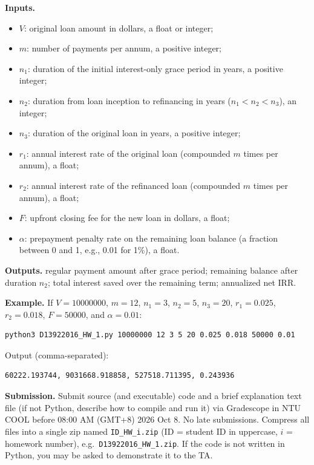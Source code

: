 \documentclass[11pt,a4paper]{article}
\begin{document}
\textbf{Inputs.}
\begin{itemize}[nosep]
  \item $V$: original loan amount in dollars, a float or integer;
  \item $m$: number of payments per annum, a positive integer;
  \item $n_1$: duration of the initial interest-only grace period in years, a positive integer;
  \item $n_2$: duration from loan inception to refinancing in years ($n_1<n_2<n_3$), an integer;
  \item $n_3$: duration of the original loan in years, a positive integer;
  \item $r_1$: annual interest rate of the original loan (compounded $m$ times per annum), a float;
  \item $r_2$: annual interest rate of the refinanced loan (compounded $m$ times per annum), a float;
  \item $F$: upfront closing fee for the new loan in dollars, a float;
  \item $\alpha$: prepayment penalty rate on the remaining loan balance (a
        fraction between 0 and 1, e.g., 0.01 for 1\%), a float.
\end{itemize}

\textbf{Outputs.} regular payment amount after grace period; remaining balance
after duration $n_2$; total interest saved over the remaining term; annualized
net IRR.

\textbf{Example.} If $V=10000000$, $m=12$, $n_1=3$, $n_2=5$, $n_3=20$,
$r_1=0.025$, $r_2=0.018$, $F=50000$, and $\alpha=0.01$:
\begin{verbatim}
python3 D13922016_HW_1.py 10000000 12 3 5 20 0.025 0.018 50000 0.01
\end{verbatim}
Output (comma-separated):
\begin{verbatim}
60222.193744, 9031668.918858, 527518.711395, 0.243936
\end{verbatim}

\textbf{Submission.} Submit source (and executable) code and a brief
explanation text file (if not Python, describe how to compile and run it) via
Gradescope in NTU COOL before 08:00 AM (GMT+8) 2026 Oct 8. No late
submissions. Compress all files into a single zip named \texttt{ID\_HW\_i.zip}
(ID = student ID in uppercase, $i$ = homework number), e.g.\
\texttt{D13922016\_HW\_1.zip}. If the code is not written in Python, you may be
asked to demonstrate it to the TA.
\end{document}
